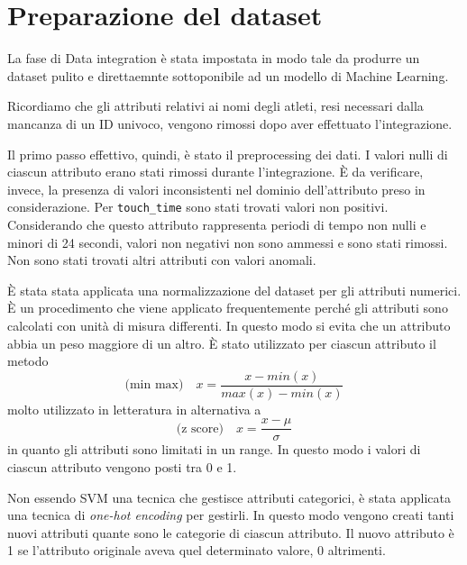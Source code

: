 
\section{Preparazione del dataset}

La fase di Data integration è stata impostata in modo tale da produrre un dataset pulito e direttaemnte sottoponibile ad un modello di Machine Learning.

Ricordiamo che gli attributi relativi ai nomi degli atleti, resi necessari dalla mancanza di un ID univoco, vengono rimossi dopo aver effettuato l'integrazione.

Il primo passo effettivo, quindi, è stato il preprocessing dei dati. I valori nulli di ciascun attributo erano stati rimossi durante l'integrazione. È da verificare, invece, la presenza di valori inconsistenti nel dominio dell'attributo preso in considerazione.
Per \texttt{touch\_time} sono stati trovati valori non positivi. Considerando che questo attributo rappresenta periodi di tempo non nulli e minori di 24 secondi, valori non negativi non sono ammessi e sono stati rimossi.
Non sono stati trovati altri attributi con valori anomali.

\par

È stata stata applicata una normalizzazione del dataset per gli attributi numerici. È un procedimento che viene applicato frequentemente perché gli attributi sono calcolati con unità di misura differenti. In questo modo si evita che un attributo abbia un peso maggiore di un altro. È stato utilizzato per ciascun attributo il metodo
\begin{equation}
\text{(min max)}\quad x = \dfrac{x - min(x)}{max(x) - min(x)}
\end{equation}
molto utilizzato in letteratura in alternativa a
\begin{equation}
\text{(z score)}\quad x = \dfrac{x - \mu}{\sigma}
\end{equation}
in quanto gli attributi sono limitati in un range. In questo modo i valori di ciascun attributo vengono posti tra 0 e 1.

\par
Non essendo SVM una tecnica che gestisce attributi categorici, è stata applicata una tecnica di \textit{one-hot encoding} per gestirli. In questo modo vengono creati tanti nuovi attributi quante sono le categorie di ciascun attributo. Il nuovo attributo è 1 se l'attributo originale aveva quel determinato valore, 0 altrimenti.